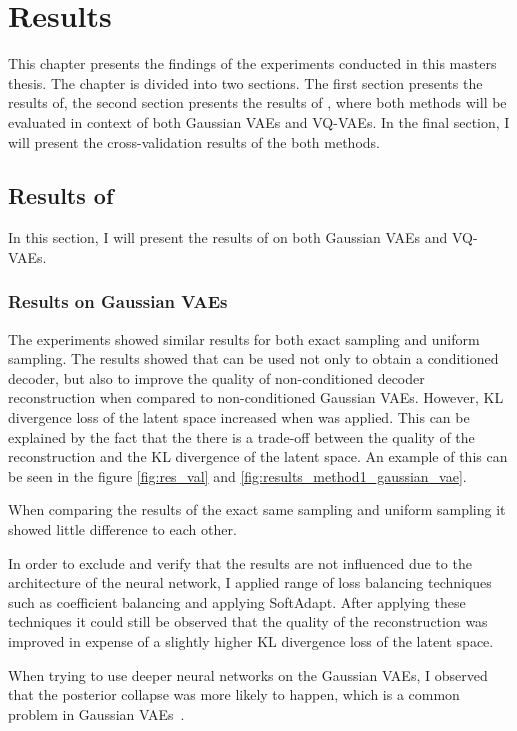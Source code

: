\chapter{Results}

This chapter presents the findings of the experiments conducted in this masters thesis. The chapter is divided into two sections.
The first section presents the results of, the second section presents the results of , where both methods will be evaluated in context of both Gaussian VAEs and VQ-VAEs. In the final section, I will present the cross-validation results of the both methods.

\section{Results of }

In this section, I will present the results of  on both Gaussian VAEs and VQ-VAEs.

\subsection{Results on Gaussian VAEs}

The experiments showed similar results for both exact sampling and uniform sampling. The results showed that  can be used not only to obtain a conditioned decoder, but also to improve the quality of non-conditioned decoder reconstruction when compared to non-conditioned Gaussian VAEs. However, KL divergence loss of the latent space increased when  was applied. This can be explained by the fact that the there is a trade-off between the quality of the reconstruction and the KL divergence of the latent space. An example of this can be seen in the figure  \ref{fig:res_val} and \ref{fig:results_method1_gaussian_vae}. 

When comparing the results of the exact same sampling and uniform sampling it showed little difference to each other.

In order to exclude and verify that the results are not influenced due to the architecture of the neural network, I applied range of loss balancing techniques such as coefficient balancing and applying SoftAdapt. After applying these techniques it could still be observed that the quality of the reconstruction was improved in expense of a slightly higher KL divergence loss of the latent space.

When trying to use deeper neural networks on the Gaussian VAEs, I observed that the posterior collapse was more likely to happen, which is a common problem in Gaussian VAEs~\cite{wang2023posterior}.

